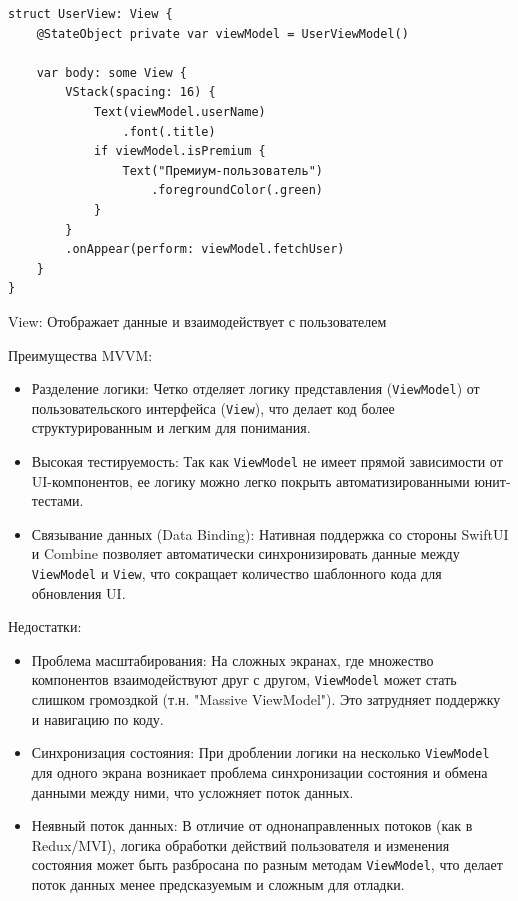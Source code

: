 \documentclass[14pt, russian]{scrartcl}
\begin{document}
\begin{enumerate}
\begin{listing}[H]
\begin{verbatim}
struct UserView: View {
    @StateObject private var viewModel = UserViewModel()

    var body: some View {
        VStack(spacing: 16) {
            Text(viewModel.userName)
                .font(.title)
            if viewModel.isPremium {
                Text("Премиум-пользователь")
                    .foregroundColor(.green)
            }
        }
        .onAppear(perform: viewModel.fetchUser)
    }
}
    \end{verbatim}
    \caption{View: Отображает данные и взаимодействует с пользователем}
    \label{lst:swith_mvvm_view}
    \end{listing}

\end{enumerate}

Преимущества MVVM:

\begin{itemize}
    \item Разделение логики: Четко отделяет логику представления (\texttt{ViewModel}) от пользовательского интерфейса (\texttt{View}), что делает код более структурированным и легким для понимания.
    \item Высокая тестируемость: Так как \texttt{ViewModel} не имеет прямой зависимости от UI-компонентов, ее логику можно легко покрыть автоматизированными юнит-тестами.
    \item Связывание данных (Data Binding): Нативная поддержка со стороны SwiftUI и Combine позволяет автоматически синхронизировать данные между \texttt{ViewModel} и \texttt{View}, что сокращает количество шаблонного кода для обновления UI.
\end{itemize}

Недостатки:
\begin{itemize}
    \item Проблема масштабирования: На сложных экранах, где множество компонентов взаимодействуют друг с другом, \texttt{ViewModel} может стать слишком громоздкой (т.н. "Massive ViewModel"). Это затрудняет поддержку и навигацию по коду.
    \item Синхронизация состояния: При дроблении логики на несколько \texttt{ViewModel} для одного экрана возникает проблема синхронизации состояния и обмена данными между ними, что усложняет поток данных.
    \item Неявный поток данных: В отличие от однонаправленных потоков (как в Redux/MVI), логика обработки действий пользователя и изменения состояния может быть разбросана по разным методам \texttt{ViewModel}, что делает поток данных менее предсказуемым и сложным для отладки.
\end{itemize}
\end{document}
